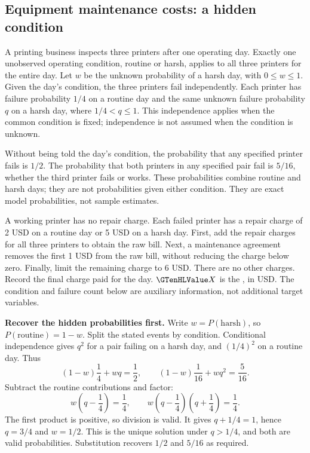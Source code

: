 \clearpage
\subsection{Equipment maintenance costs: a hidden condition}\label{prob:maintenance}
A printing business inspects three printers after one operating day. Exactly one unobserved operating condition, routine or harsh, applies to all three printers for the entire day. Let $w$ be the unknown probability of a harsh day, with $0\leq w\leq1$. Given the day's condition, the three printers fail independently. Each printer has failure probability $1/4$ on a routine day and the same unknown failure probability $q$ on a harsh day, where $1/4<q\leq1$. This independence applies when the common condition is fixed; independence is not assumed when the condition is unknown.

Without being told the day's condition, the probability that any specified printer fails is $1/2$. The probability that both printers in any specified pair fail is $5/16$, whether the third printer fails or works. These probabilities combine routine and harsh days; they are not probabilities given either condition. They are exact model probabilities, not sample estimates.

A working printer has no repair charge. Each failed printer has a repair charge of 2 USD on a routine day or 5 USD on a harsh day. First, add the repair charges for all three printers to obtain the raw bill. Next, a maintenance agreement removes the first 1 USD from the raw bill, without reducing the charge below zero. Finally, limit the remaining charge to 6 USD. There are no other charges. Record the final charge paid for the day.
$\cTwoValue{X}$ is the , in USD. The condition and failure count below are auxiliary information, not additional target variables.

\textbf{Recover the hidden probabilities first.} Write $w=P(\text{harsh})$, so $P(\text{routine})=1-w$. Split the stated events by condition. Conditional independence gives $q^2$ for a pair failing on a harsh day, and $(1/4)^2$ on a routine day. Thus
\[
(1-w)\frac14+wq=\frac12,\qquad
(1-w)\frac1{16}+wq^2=\frac5{16}.
\]
Subtract the routine contributions and factor:
\[
w\left(q-\frac14\right)=\frac14,\qquad
w\left(q-\frac14\right)\left(q+\frac14\right)=\frac14.
\]
The first product is positive, so division is valid. It gives $q+1/4=1$, hence $q=3/4$ and $w=1/2$. This is the unique solution under $q>1/4$, and both are valid probabilities. Substitution recovers $1/2$ and $5/16$ as required.

